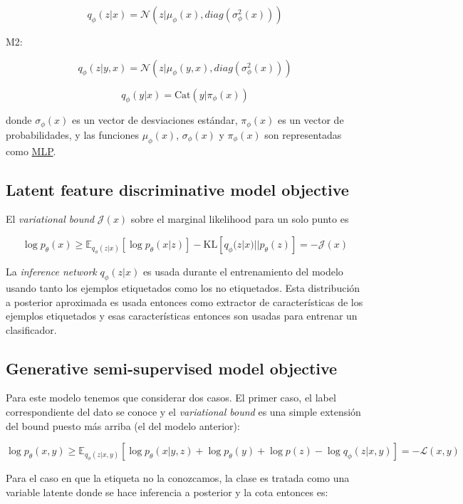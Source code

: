 \documentclass[letterpaper,11pt]{article} %
\begin{document}
	$$ q_{\phi}(z|x) = \mathcal{N}(z | \mu_{\phi}(x), diag(\sigma^{2}_{\phi}(x))) $$
	
	M2:
	
	$$ q_{\phi}(z|y,x) = \mathcal{N}(z| \mu_{\phi}(y,x), diag(\sigma^{2}_{\phi}(x))) $$
	
	$$ q_{\phi}(y|x) = \mathrm{Cat}(y|\pi_{\phi}(x)) $$
	
	donde $\sigma_{\phi}(x)$ es un vector de desviaciones estándar, $\pi_{\phi}(x)$ es un vector de probabilidades, y las funciones $\mu_{\phi}(x)$, $\sigma_{\phi}(x)$ y $\pi_{\phi}(x)$ son representadas como \href{https://en.wikipedia.org/wiki/Multilayer_perceptro}{MLP}.
	
\subsection{Latent feature discriminative model objective}

	El \textit{variational bound} $\mathcal{J}(x)$ sobre el marginal likelihood para un solo punto es
	
	$$ \log p_{\theta}(x) \geq \mathbb{E}_{q_{\phi}(z|x)}[\log p_{\theta}(x|z)] - \mathrm{KL}[q_{\phi}(z|x)||p_{\theta}(z)] = - \mathcal{J}(x) $$
	
	La \textit{inference network} $q_{\phi}(z|x)$ es usada durante el entrenamiento del modelo usando tanto los ejemplos etiquetados como los no etiquetados. Esta distribución a posterior aproximada es usada entonces como extractor de características de los ejemplos etiquetados y esas características entonces son usadas para entrenar un clasificador.
	
\subsection{Generative semi-supervised model objective}

	Para este modelo tenemos que considerar dos casos. El primer caso, el label correspondiente del dato se conoce y el \textit{variational bound} es una simple extensión del bound puesto más arriba (el del modelo anterior):
	
	$$\log p_{\theta}(x,y) \geq
	\mathbb{E}_{q_{\phi}(z|x,y)}[\log p_{\theta}(x|y,z) + \log p_{\theta}(y) + \log p(z) - \log q_{\phi}(z|x,y)] = -\mathcal{L}(x,y) $$
	
	Para el caso en que la etiqueta no la conozcamos, la clase es tratada como una variable latente donde se hace inferencia a posterior y la cota entonces es:
	
\end{document}
